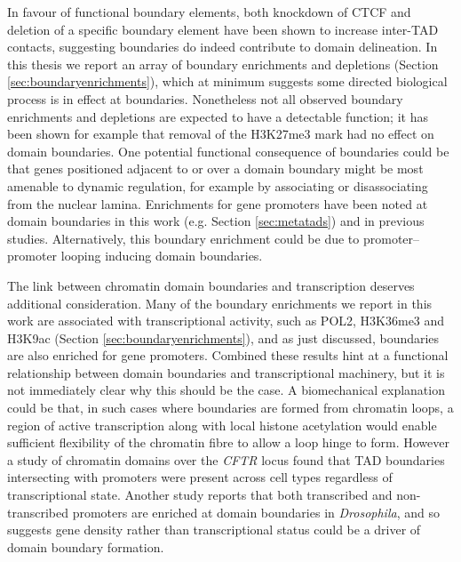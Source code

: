 \documentclass[a4paper,11pt,oneside]{book}
\begin{document}
In favour of functional boundary elements, both knockdown of CTCF\cite{Zuin2013} and deletion of a specific boundary element\cite{Nora2012} have been shown to increase inter-TAD contacts, suggesting boundaries do indeed contribute to domain delineation. In this thesis we report an array of boundary enrichments and depletions (Section \ref{sec:boundaryenrichments}), which at minimum suggests some directed biological process is in effect at boundaries. Nonetheless not all observed boundary enrichments and depletions are expected to have a detectable function; it has been shown for example that removal of the H3K27me3 mark had no effect on domain boundaries.\cite{Nora2012} One potential functional consequence of boundaries could be that genes positioned adjacent to or over a domain boundary might be most amenable to dynamic regulation, for example by associating or disassociating from the nuclear lamina. Enrichments for gene promoters have been noted at domain boundaries in this work (e.g. Section \ref{sec:metatads}) and in previous studies.\cite{Dixon2012} Alternatively, this boundary enrichment could be due to promoter--promoter looping inducing domain boundaries.\cite{Li2012a, Sanyal2012, Sexton2015} 

The link between chromatin domain boundaries and transcription deserves additional consideration. Many of the boundary enrichments we report in this work are associated with transcriptional activity, such as POL2, H3K36me3 and H3K9ac (Section \ref{sec:boundaryenrichments}), and as just discussed, boundaries are also enriched for gene promoters. Combined these results hint at a functional relationship between domain boundaries and transcriptional machinery, but it is not immediately clear why this should be the case. A biomechanical explanation could be that, in such cases where boundaries are formed from chromatin loops, a region of active transcription along with local histone acetylation would enable sufficient flexibility of the chromatin fibre to allow a loop hinge to form. However a study of chromatin domains over the \emph{CFTR} locus found that TAD boundaries intersecting with promoters were present across cell types regardless of transcriptional state.\cite{Smith2016a} Another study reports that both transcribed and non-transcribed promoters are enriched at domain boundaries in \emph{Drosophila},\cite{Hou2012} and so suggests gene density rather than transcriptional status could be a driver of domain boundary formation.
\end{document}
